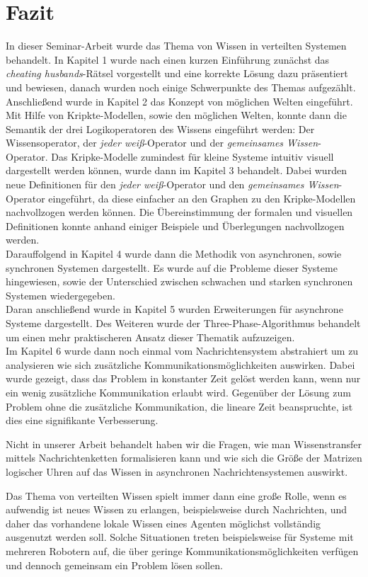 \section{Fazit}
\label{Zusammenfassung}
In dieser Seminar-Arbeit wurde das Thema von Wissen in verteilten Systemen behandelt.
In Kapitel 1 wurde nach einen kurzen Einführung zunächst das \textit{cheating husbands}-Rätsel vorgestellt und eine korrekte Lösung dazu präsentiert und bewiesen, danach wurden noch einige Schwerpunkte des Themas aufgezählt.
Anschließend wurde in Kapitel 2 das Konzept von möglichen Welten eingeführt. Mit Hilfe von Kripkte-Modellen, sowie den möglichen Welten, konnte dann die Semantik der drei Logikoperatoren des Wissens eingeführt werden: Der Wissensoperator, der \textit{jeder weiß}-Operator und der \textit{gemeinsames Wissen}-Operator.
Das Kripke-Modelle zumindest für kleine Systeme intuitiv visuell dargestellt werden können, wurde dann im Kapitel 3 behandelt. Dabei wurden neue Definitionen für den \textit{jeder weiß}-Operator und den \textit{gemeinsames Wissen}-Operator eingeführt, da diese einfacher an den Graphen zu den Kripke-Modellen nachvollzogen werden können. Die Übereinstimmung der formalen und visuellen Definitionen konnte anhand einiger Beispiele und Überlegungen nachvollzogen werden.\\
Darauffolgend in Kapitel 4 wurde dann die Methodik von asynchronen, sowie synchronen Systemen dargestellt. Es wurde auf die Probleme dieser Systeme hingewiesen, sowie der Unterschied zwischen schwachen und starken synchronen Systemen wiedergegeben.\\
Daran anschließend wurde in Kapitel 5 wurden Erweiterungen für asynchrone Systeme dargestellt. Des Weiteren wurde der Three-Phase-Algorithmus behandelt um einen mehr praktischeren Ansatz dieser Thematik aufzuzeigen. \\
Im Kapitel 6 wurde dann noch einmal vom Nachrichtensystem abstrahiert um zu analysieren wie sich zusätzliche Kommunikationsmöglichkeiten auswirken.
Dabei wurde gezeigt, dass das Problem in konstanter Zeit gelöst werden kann, wenn nur ein wenig zusätzliche Kommunikation erlaubt wird. Gegenüber der Lösung zum Problem ohne die zusätzliche Kommunikation, die lineare Zeit beanspruchte, ist dies eine signifikante Verbesserung.\medskip

Nicht in unserer Arbeit behandelt haben wir die Fragen, wie man Wissenstransfer mittels Nachrichtenketten formalisieren kann und wie sich die Größe der Matrizen logischer Uhren auf das Wissen in asynchronen Nachrichtensystemen auswirkt.\medskip

Das Thema von verteilten Wissen spielt immer dann eine große Rolle, wenn es aufwendig ist neues Wissen zu erlangen, beispielsweise durch Nachrichten, und daher das vorhandene lokale Wissen eines Agenten möglichst vollständig ausgenutzt werden soll.
Solche Situationen treten beispielsweise für Systeme mit mehreren Robotern auf, die über geringe Kommunikationsmöglichkeiten verfügen und dennoch gemeinsam ein Problem lösen sollen.